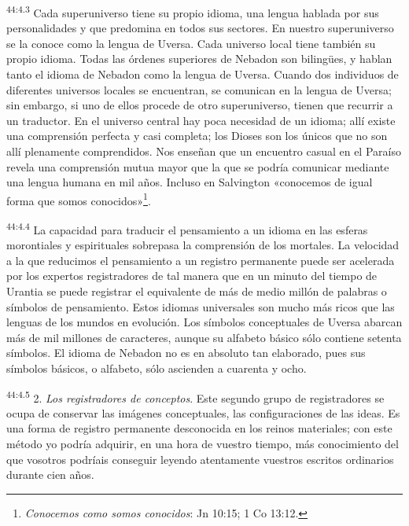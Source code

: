 \par
\textsuperscript{44:4.3} Cada superuniverso tiene su propio idioma, una lengua hablada por sus personalidades y que predomina en todos sus sectores. En nuestro superuniverso se la conoce como la lengua de Uversa. Cada universo local tiene también su propio idioma. Todas las órdenes superiores de Nebadon son biling\"ues, y hablan tanto el idioma de Nebadon como la lengua de Uversa. Cuando dos individuos de diferentes universos locales se encuentran, se comunican en la lengua de Uversa; sin embargo, si uno de ellos procede de otro superuniverso, tienen que recurrir a un traductor. En el universo central hay poca necesidad de un idioma; allí existe una comprensión perfecta y casi completa; los Dioses son los únicos que no son allí plenamente comprendidos. Nos enseñan que un encuentro casual en el Paraíso revela una comprensión mutua mayor que la que se podría comunicar mediante una lengua humana en mil años. Incluso en Salvington «conocemos de igual forma que somos conocidos»\footnote{\textit{Conocemos como somos conocidos}: Jn 10:15; 1 Co 13:12.}.

\par
\textsuperscript{44:4.4} La capacidad para traducir el pensamiento a un idioma en las esferas morontiales y espirituales sobrepasa la comprensión de los mortales. La velocidad a la que reducimos el pensamiento a un registro permanente puede ser acelerada por los expertos registradores de tal manera que en un minuto del tiempo de Urantia se puede registrar el equivalente de más de medio millón de palabras o símbolos de pensamiento. Estos idiomas universales son mucho más ricos que las lenguas de los mundos en evolución. Los símbolos conceptuales de Uversa abarcan más de mil millones de caracteres, aunque su alfabeto básico sólo contiene setenta símbolos. El idioma de Nebadon no es en absoluto tan elaborado, pues sus símbolos básicos, o alfabeto, sólo ascienden a cuarenta y ocho.

\par
\textsuperscript{44:4.5} 2. \textit{Los registradores de conceptos}. Este segundo grupo de registradores se ocupa de conservar las imágenes conceptuales, las configuraciones de las ideas. Es una forma de registro permanente desconocida en los reinos materiales; con este método yo podría adquirir, en una hora de vuestro tiempo, más conocimiento del que vosotros podríais conseguir leyendo atentamente vuestros escritos ordinarios durante cien años.

